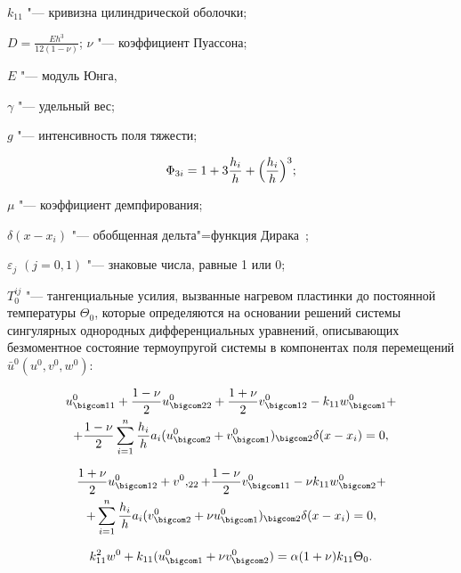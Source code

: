 $k_{11}$ "--- кривизна цилиндрической оболочки; 

$D=\frac{E h^3}{12(1-\nu)}$; $\nu$ "--- коэффициент Пуассона; 

$E$ "--- модуль Юнга, 

$\gamma$ "--- удельный вес; 

$g$ "--- интенсивность поля тяжести; 

$$\Phi_{3i}=1+3\frac{h_i}{h}+\Bigl( \frac{h_i}{h}\Bigr)^3 ;$$ 

$\mu$ "--- коэффициент демпфирования; 

$\delta(x-x_i)$ "--- обобщенная дельта"=функция Дирака~\cite{myl-bib:25};  

$\varepsilon_j$ $(j=0,1)$ "--- знаковые числа, равные 1 или 0; 

$ T^{ij}_0 $ "--- тангенциальные усилия, вызванные нагревом пластинки до постоянной температуры $\Theta_0$, которые определяются на основании решений системы сингулярных однородных дифференциальных уравнений, описывающих безмоментное состояние термоупругой системы в компонентах поля перемещений $\bar{u}^0(u^0,v^0,w^0)$:

 \begin{multline}

 u^0_{\bigcom 11}+\frac{1-\nu}{2}u^0_{\bigcom 22}+\frac{1+\nu}{2}v^0_{\bigcom 12}-k_{11}w^0_{\bigcom 1}+

\\

 +\frac{1-\nu}{2}\sum_{i=1}^{n}\frac{h_i}{h}a_i ( u^0_{\bigcom 2}+v^0_{\bigcom 1})_{\bigcom 2}\delta(x-x_i) =0,

 \end{multline}

 \begin{multline}

 \frac{1+\nu}{2}u^0_{\bigcom 12}+v^0,_{22}+\frac{1-\nu}{2}v^0_{\bigcom 11}-\nu k_{11}w^0_{\bigcom 2}+

\\

+ 

 \sum_{i=1}^{n}\frac{h_i}{h}a_i( v^0_{\bigcom 2}+\nu u^0_{\bigcom 1})_{\bigcom 2}\delta(x-x_i)=0,

 \end{multline}

\begin{equation}\label{eq:bel:momentnot}

k_{11}^2 w^0+k_{11} (u^0_{\bigcom 1}+\nu v^0_{\bigcom 2} ) =\alpha(1+\nu)k_{11}\Theta_0.

\end{equation}





